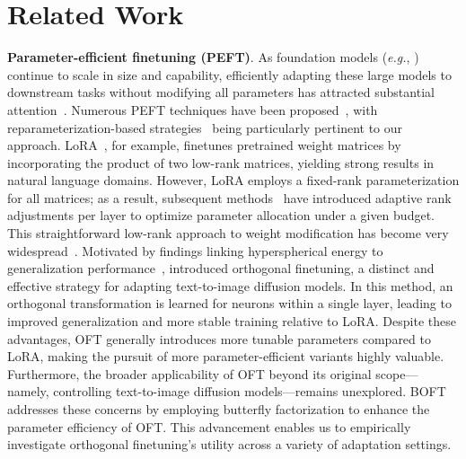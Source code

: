 \section{Related Work}

\textbf{Parameter-efficient finetuning (PEFT)}. As foundation models (\emph{e.g.}, \cite{brown2020language,radford2021learning,rombach2022high,kirillov2023segment}) continue to scale in size and capability, efficiently adapting these large models to downstream tasks without modifying all parameters has attracted substantial attention~\cite{treviso2023efficient,ding2023parameter,lialin2023scaling}. Numerous PEFT techniques have been proposed~\cite{houlsby2019parameter,aghajanyan2020intrinsic,hulora2022,edalati2022krona,wang2022adamix,gheini2021cross,zaken2022bitfit,guo2020parameter,sung2021training,ansell2022composable,lester2021power,li2021prefix,vu2022spot,he2021towards,mao2021unipelt,karimi2021compacter,liu2022few,sung2022lst,chen2022parameter,jia2022visual,chen2022adaptformer,zhang2022neural,jie2023fact,lian2022scaling,luo2023towards}, with reparameterization-based strategies~\cite{aghajanyan2020intrinsic,hulora2022,edalati2022krona} being particularly pertinent to our approach. LoRA~\cite{hulora2022}, for example, finetunes pretrained weight matrices by incorporating the product of two low-rank matrices, yielding strong results in natural language domains. However, LoRA employs a fixed-rank parameterization for all matrices; as a result, subsequent methods~\cite{zhang2022adaptive,valipour2022dylora,zhang2023increlora} have introduced adaptive rank adjustments per layer to optimize parameter allocation under a given budget. This straightforward low-rank approach to weight modification has become very widespread~\cite{dettmers2023qlora,zi2023delta,chavan2023one}. Motivated by findings linking hyperspherical energy to generalization performance~\cite{liu2018learning,liu2021orthogonal}, \cite{qiu2023controlling} introduced orthogonal finetuning, a distinct and effective strategy for adapting text-to-image diffusion models. In this method, an orthogonal transformation is learned for neurons within a single layer, leading to improved generalization and more stable training relative to LoRA. Despite these advantages, OFT generally introduces more tunable parameters compared to LoRA, making the pursuit of more parameter-efficient variants highly valuable. Furthermore, the broader applicability of OFT beyond its original scope—namely, controlling text-to-image diffusion models—remains unexplored. BOFT addresses these concerns by employing butterfly factorization to enhance the parameter efficiency of OFT. This advancement enables us to empirically investigate orthogonal finetuning’s utility across a variety of adaptation settings.

